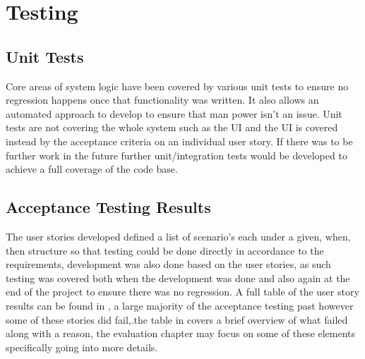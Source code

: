 \section{Testing}
\subsection{Unit Tests}
Core areas of system logic have been covered by various unit tests to ensure no regression happens once that functionality was written. It also allows an automated approach to develop to ensure that man power isn't an issue. Unit tests are not covering the whole system such as the UI and the UI is covered instead by the acceptance criteria on an individual user story. If there was to be further work in the future further unit/integration tests would be developed to achieve a full coverage of the code base.

\subsection{Acceptance Testing Results}
The user stories developed defined a list of scenario's each under a given, when, then structure so that testing could be done directly in accordance to the requirements, development was also done based on the user stories, as such testing was covered both when the development was done and also again at the end of the project to ensure there was no regression. A full table of the user story results can be found in \appendixtemp, a large majority of the acceptance testing past however some of these stories did fail,.the table in \appendixtemp covers a brief overview of what failed along with a reason, the evaluation chapter may focus on some of these elements specifically going into more details.